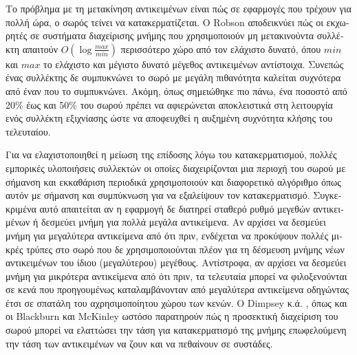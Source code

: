 \begin{greek}
Το πρόβλημα με τη μετακίνηση αντικειμένων είναι πώς σε εφαρμογές
που τρέχουν για πολλή ώρα, ο σωρός τείνει να κατακερματίζεται.
Ο Robson \cite{DBLP:journals/jacm/Robson71, DBLP:journals/jacm/Robson74}
αποδεικνύει πώς οι εκχωρητές σε συστήματα διαχείρισης μνήμης που
χρησιμοποιούν μη μετακινούντα συλλέκτη απαιτούν $O(\log{\frac{max}{min}})$
περισσότερο χώρο από τον ελάχιστο δυνατό, όπου $min$ και $max$
το ελάχιστο και μέγιστο δυνατό μέγεθος αντικειμένων αντίστοιχα.
Συνεπώς ένας συλλέκτης δε συμπυκνώνει το σωρό με μεγάλη πιθανότητα
καλείται συχνότερα από έναν που το συμπυκνώνει. Ακόμη, όπως
σημειώθηκε πιο πάνω, ένα ποσοστό από 20\% έως και 50\% του σωρού
πρέπει να αφιερώνεται αποκλειστικά στη λειτουργία ενός συλλέκτη
εξιχνίασης ώστε να αποφευχθεί η αυξημένη συχνότητα κλήσης του
τελευταίου.

Για να ελαχιστοποιηθεί η μείωση της επίδοσης λόγω του κατακερματισμού,
πολλές εμπορικές υλοποιήσεις συλλεκτών οι οποίες διαχειρίζονται
μια περιοχή του σωρού με σήμανση και εκκαθάριση περιοδικά χρησιμοποιούν
και διαφορετικό αλγόριθμο όπως αυτόν με σήμανση και συμπύκνωση για
να εξαλείψουν τον κατακερματισμό. Συγκεκριμένα αυτό απαιτείται
αν η εφαρμογή δε διατηρεί σταθερό ρυθμό μεγεθών αντικειμένων ή
δεσμεύει μνήμη για πολλά μεγάλα αντικείμενα. Αν αρχίσει να δεσμεύει
μνήμη για μεγαλύτερα αντικείμενα από ότι πριν, ενδέχεται να προκύψουν
πολλές μικρές τρύπες στο σωρό που δε χρησιμοποιούνται πλέον για
τη δέσμευση μνήμης νέων αντικειμένων του ίδιου (μεγαλύτερου)
μεγέθους. Αντίστροφα, αν αρχίσει να δεσμεύει μνήμη για μικρότερα
αντικείμενα από ότι πριν, τα τελευταία μπορεί να φιλοξενούνται
σε κενά που προηγουμένως καταλαμβάνονταν από μεγαλύτερα αντικείμενα
οδηγώντας έτσι σε σπατάλη του αχρησιμοποίητου χώρου των κενών. 
Ο Dimpsey κ.ά. \cite{DBLP:journals/ibmsj/DimpseyAK00}, όπως και
οι Blackburn και McKinley \cite{DBLP:conf/pldi/BlackburnM08}
ωστόσο παρατηρούν πώς η προσεκτική διαχείριση του σωρού μπορεί
να ελαττώσει την τάση για κατακερματισμό της μνήμης επωφελούμενη
την τάση των αντικειμένων να ζουν και να πεθαίνουν σε συστάδες.

\end{greek}
